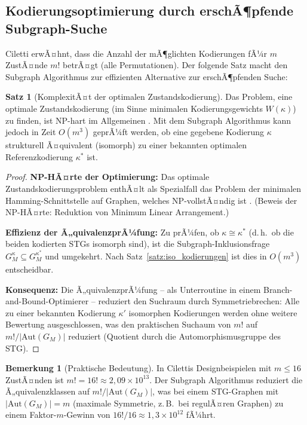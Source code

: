 ﻿\documentclass[a4paper,12pt]{article}
\theoremstyle{definition}
\newtheorem{satz}{Satz}
\newtheorem{bemerkung}{Bemerkung}
\begin{document}
\subsection{Kodierungsoptimierung durch erschÃ¶pfende Subgraph-Suche}

Ciletti \cite[S.~107]{ciletti2011} erwÃ¤hnt, dass die Anzahl der mÃ¶glichten Kodierungen
fÃ¼r $m$ ZustÃ¤nde $m!$ betrÃ¤gt (alle Permutationen). Der folgende Satz macht den
Subgraph Algorithmus zur effizienten Alternative zur erschÃ¶pfenden Suche:

\begin{satz}[KomplexitÃ¤t der optimalen Zustandskodierung]\label{satz:kodzkomp}
  Das Problem, eine optimale Zustandskodierung (im Sinne minimalen Kodierungsgewichts
  $W(\kappa)$) zu finden, ist NP-hart im Allgemeinen \cite[S.~107]{ciletti2011}.
  Mit dem Subgraph Algorithmus kann jedoch in Zeit $O(m^3)$ geprÃ¼ft werden, ob eine
  gegebene Kodierung $\kappa$ strukturell Ã¤quivalent (isomorph) zu einer bekannten
  optimalen Referenzkodierung $\kappa^*$ ist.
\end{satz}

\begin{proof}
  \textbf{NP-HÃ¤rte der Optimierung:} Das optimale Zustandskodierungsproblem enthÃ¤lt als
  Spezialfall das Problem der minimalen Hamming-Schnittstelle auf Graphen, welches
  NP-vollstÃ¤ndig ist \cite{garey1979computers}. (Beweis der NP-HÃ¤rte: Reduktion von
  Minimum Linear Arrangement.)

  \textbf{Effizienz der Ã„quivalenzprÃ¼fung:} Zu prÃ¼fen, ob $\kappa \cong \kappa^*$
  (d.\,h.\ ob die beiden kodierten STGs isomorph sind), ist die Subgraph-Inklusionsfrage
  $G_M^\kappa \subseteq G_M^{\kappa^*}$ und umgekehrt. Nach
  Satz~\ref{satz:iso_kodierungen} ist dies in $O(m^3)$ entscheidbar.

  \textbf{Konsequenz:} Die Ã„quivalenzprÃ¼fung -- als Unterroutine in einem
  Branch-and-Bound-Optimierer -- reduziert den Suchraum durch Symmetriebrechen:
  Alle zu einer bekannten Kodierung $\kappa'$ isomorphen Kodierungen werden ohne weitere
  Bewertung ausgeschlossen, was den praktischen Suchaum von $m!$ auf $m!/|\text{Aut}(G_M)|$
  reduziert (Quotient durch die Automorphismusgruppe des STG).
\end{proof}

\begin{bemerkung}[Praktische Bedeutung]\label{bem:kodpraktik}
  In Cilettis Designbeispielen \cite[Kap.~3]{ciletti2011} mit $m \leq 16$ ZustÃ¤nden
  ist $m! = 16! \approx 2{,}09 \times 10^{13}$. Der Subgraph Algorithmus reduziert
  die Ã„quivalenzklassen auf $m!/|\text{Aut}(G_M)|$, was bei einem STG-Graphen mit
  $|\text{Aut}(G_M)| = m$ (maximale Symmetrie, z.\,B.\ bei regulÃ¤ren Graphen) zu einem
  Faktor-$m$-Gewinn von $16! / 16 \approx 1{,}3 \times 10^{12}$ fÃ¼hrt.
\end{bemerkung}
\end{document}
